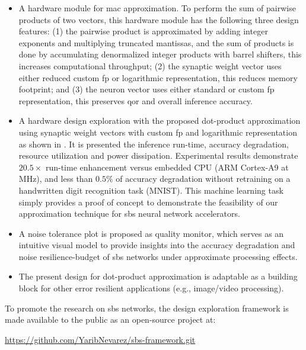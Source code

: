 \begin{itemize}
	\item A hardware module for \gls{mac} approximation. To perform the sum of pairwise products of two vectors, this hardware module has the following three design features: (1) the pairwise product is approximated by adding integer exponents and multiplying truncated mantissas, and the sum of products is done by accumulating denormalized integer products with barrel shifters, this increases computational throughput; (2) the synaptic weight vector uses either reduced custom \gls{fp} or logarithmic representation, this reduces memory footprint; and (3) the neuron vector uses either standard or custom \gls{fp} representation, this preserves \gls{qor} and overall inference accuracy.
	\item A hardware design exploration with the proposed dot-product approximation using synaptic weight vectors with custom \gls{fp} and logarithmic representation as shown in . It is presented the inference run-time, accuracy degradation, resource utilization and power dissipation. Experimental results demonstrate $20.5\times$ run-time enhancement versus embedded CPU (ARM Cortex-A9 at \unit[666]{MHz}), and less than $0.5\%$ of accuracy degradation without retraining on a handwritten digit recognition task (MNIST). This machine learning task simply provides a proof of concept to demonstrate the feasibility of our approximation technique for \gls{sbs} neural network accelerators.
	\item A noise tolerance plot is proposed as quality monitor, which serves as an intuitive visual model to provide insights into the accuracy degradation and noise resilience-budget of \gls{sbs} networks under approximate processing effects.
	\item The present design for dot-product approximation is adaptable as a building block for other error resilient applications (e.g., image/video processing).
\end{itemize}

To promote the research on \gls{sbs} networks, the design exploration framework is made available to the public as an open-source project at:

 \url{https://github.com/YaribNevarez/sbs-framework.git}

